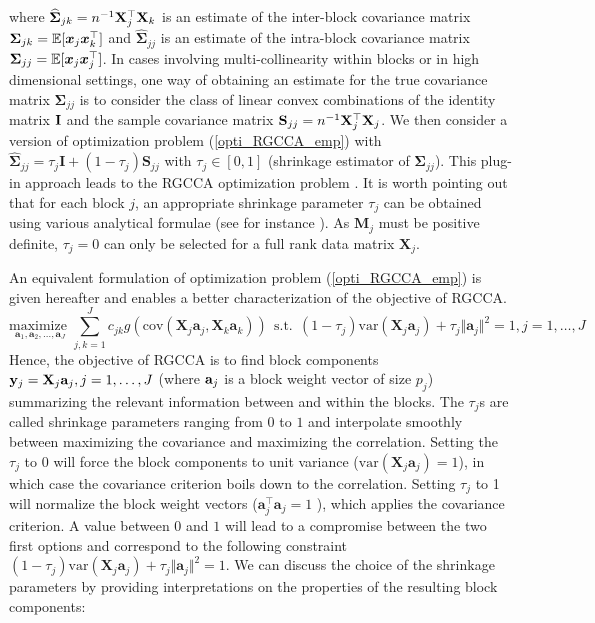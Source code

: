 \documentclass[
]{jss}
\begin{document}
where \(\widehat{\mathbf{\Sigma}}_{jk} = n^{-1}\mathbf{X}_j^\top \mathbf{X}_k\) is
an estimate of the inter-block covariance matrix
\(\mathbf{\Sigma}_{jk}= \mathbb{E}[\boldsymbol{x}_j\boldsymbol{x}_k^\top]\) and
\(\widehat{\mathbf{\Sigma}}_{jj}\) is an estimate of the intra-block
covariance matrix
\(\mathbf{\Sigma}_{jj} = \mathbb{E}[\boldsymbol{x}_j\boldsymbol{x}_j^\top]\). In cases
involving multi-collinearity within blocks or in high dimensional
settings, one way of obtaining an estimate for the true covariance
matrix \(\mathbf{\Sigma}_{jj}\) is to consider the class of linear
convex combinations of the identity matrix \(\mathbf{I}\) and the sample
covariance matrix \(\mathbf{S}_{jj} = n^{-1}\mathbf{X}_j^\top \mathbf{X}_j\). We
then consider a version of optimization problem (\ref{opti_RGCCA_emp})
with
\(\widehat{\mathbf{\Sigma}}_{jj} = \tau_j\mathbf{I} + (1-\tau_j)\mathbf{S}_{jj}\)
with \(\tau_j \in [0,1]\) (shrinkage estimator of
\(\mathbf{\Sigma}_{jj}\)). This plug-in approach leads to the RGCCA
optimization problem \citep{Tenenhaus2011}. It is worth pointing out
that for each block \(j\), an appropriate shrinkage parameter \(\tau_j\)
can be obtained using various analytical formulae (see for instance
\citep[\citet{Schafer2005}, \citet{Chen2011}]{Ledoit2004}). As
\(\mathbf{M}_j\) must be positive definite, \(\tau_j = 0\) can only be
selected for a full rank data matrix \(\mathbf{X}_j\).

An equivalent formulation of optimization problem (\ref{opti_RGCCA_emp})
is given hereafter and enables a better characterization of the
objective of RGCCA. \begin{equation}
\displaystyle \underset{\mathbf{a}_1,\mathbf{a}_2, \ldots,\mathbf{a}_J}{\text{maximize~}} \sum_{j, k = 1}^J c_{jk}g(\mathrm{cov}(\mathbf{X}_j\mathbf{a}_j, \mathbf{X}_k\mathbf{a}_k)) \mathrm{~~s.t.~~} (1-\tau_j)\mathrm{var}(\mathbf{X}_j\mathbf{a}_j) + \tau_j\Vert \mathbf{a}_j \Vert^2 = 1, j=1, \ldots,J
\label{optim_RGCCA}
\end{equation} Hence, the objective of RGCCA is to find block components
\(\mathbf{y}_j = \mathbf{X}_j \mathbf{a}_j, j = 1, \ldots, J\) (where \(\mathbf{a}_j\) is a
block weight vector of size \(p_j\)) summarizing the relevant
information between and within the blocks. The \(\tau_j\)s are called
shrinkage parameters ranging from \(0\) to \(1\) and interpolate
smoothly between maximizing the covariance and maximizing the
correlation. Setting the \(\tau_j\) to 0 will force the block components
to unit variance (\(\mathrm{var}(\mathbf{X}_j\mathbf{a}_j) = 1\)), in
which case the covariance criterion boils down to the correlation.
Setting \(\tau_j\) to 1 will normalize the block weight vectors
(\(\mathbf{a}_j^\top\mathbf{a}_j = 1\) ), which applies the covariance
criterion. A value between \(0\) and \(1\) will lead to a compromise
between the two first options and correspond to the following constraint
\((1-\tau_j)\mathrm{var}(\mathbf{X}_j\mathbf{a}_j) + \tau_j \Vert \mathbf{a}_j \Vert^2 = 1\).
We can discuss the choice of the shrinkage parameters by providing
interpretations on the properties of the resulting block components:
\end{document}
